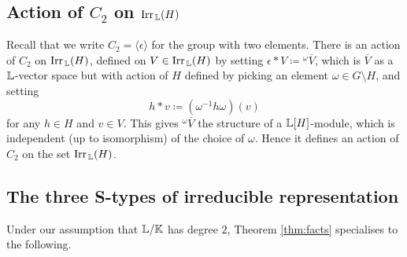 \subsection{Action of $C_2$ on $\operatorname{Irr}_{\, {\mathbb L}}(H)$} \label{sect:C2actionIrrH}
 Recall that we write $C_2 = \langle \epsilon \rangle$ for the group with two elements. There is an action of $C_2$ on $\operatorname{Irr}_{\, {\mathbb L}} (H)$,
 defined on $V \in \operatorname{Irr}_{\, {\mathbb L}}(H)$ by setting $\epsilon * V \coloneqq {}^{\omega}\overline{V}$, which is $\overline{V}$
 as a ${\mathbb L}$-vector space but with action of $H$ defined by picking an element $\omega \in G \setminus H$, and setting 
 \[
 h * v \coloneqq (\omega^{-1} h \omega)(v)
 \]
 for any $h \in H$ and $v \in V$. This gives ${}^{\omega}\overline{V}$ the structure of a ${\mathbb L}[H]$-module,
 which is independent (up to isomorphism) of the choice of $\omega$. Hence it defines an action of $C_2$ on the set $\operatorname{Irr}_{\, {\mathbb L}}(H)$.

 \subsection{The three S-types of irreducible representation}

 Under our assumption that ${\mathbb L} / {\mathbb K}$ has degree $2$, Theorem \ref{thm:facts} specialises to the following.

